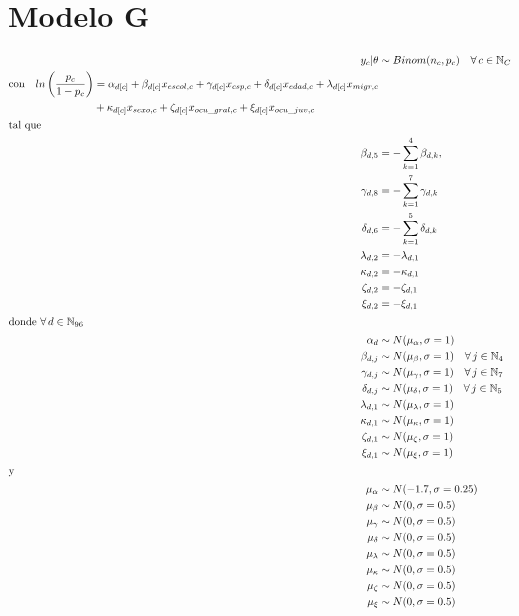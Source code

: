 \section*{Modelo G}

\begin{align}\label{eq:Modelo_Comp_G}
y_c|\theta & \sim Binom(n_c,p_c) \quad \forall \, c \in \mathbb{N}_C \nonumber \\
\begin{split}
\text{con} \quad ln\left(\dfrac{p_c}{1-p_c}\right) &= \alpha_{d[c]} + \beta_{d[c]} x_{escol,c} + \gamma_{d[c]} x_{csp,c} + \delta_{d[c]} x_{edad,c} + \lambda_{d[c]} x_{migr,c} \\
&+ \kappa_{d[c]} x_{sexo,c} + \zeta_{d[c]} x_{ocu\_gral,c} + \xi_{d[c]} x_{ocu\_juv,c} 
\end{split}\\
\intertext{tal que} 
\beta_{d,5} &= -\sum\limits_{k = 1}^{4} \beta_{d,k}, \nonumber \\
\gamma_{d,8} &= -\sum\limits_{k = 1}^{7} \gamma_{d,k} \nonumber \\
\delta_{d,6} &= -\sum\limits_{k = 1}^{5} \delta_{d,k} \nonumber \\
\lambda_{d,2} &= -\lambda_{d,1} \nonumber \\
\kappa_{d,2} &= -\kappa_{d,1} \nonumber \\
\zeta_{d,2} &= -\zeta_{d,1} \nonumber \\
\xi_{d,2} &= -\xi_{d,1} \nonumber \\
\intertext{donde $\forall \, d \in \mathbb{N}_{96}$}
\alpha_d &\sim N(\mu_{\alpha}, \sigma=1) \quad  \nonumber \\
\beta_{d,j} &\sim N(\mu_{\beta}, \sigma=1) \quad \forall \, j \in \mathbb{N}_{4} \nonumber \\
\gamma_{d,j} &\sim N(\mu_{\gamma}, \sigma=1) \quad \forall \, j \in \mathbb{N}_{7} \nonumber \\
\delta_{d,j} &\sim N(\mu_{\delta}, \sigma=1) \quad \forall \, j \in \mathbb{N}_{5}  \nonumber \\ 
\lambda_{d,1} &\sim N(\mu_{\lambda}, \sigma=1) \nonumber \\
\kappa_{d,1} &\sim N(\mu_{\kappa}, \sigma=1) \nonumber \\ 
\zeta_{d,1} &\sim N(\mu_{\zeta}, \sigma=1) \nonumber \\
\xi_{d,1} &\sim N(\mu_{\xi}, \sigma=1) \nonumber \\
\intertext{y}
\mu_{\alpha} &\sim N(-1.7,\sigma=0.25) \nonumber \\
\mu_{\beta} &\sim N(0,\sigma=0.5) \nonumber \\
\mu_{\gamma} &\sim N(0,\sigma=0.5) \nonumber \\
\mu_{\delta} &\sim N(0,\sigma=0.5) \nonumber \\
\mu_{\lambda} &\sim N(0,\sigma=0.5) \nonumber \\
\mu_{\kappa} &\sim N(0,\sigma=0.5) \nonumber \\
\mu_{\zeta} &\sim N(0,\sigma=0.5) \nonumber \\
\mu_{\xi} &\sim N(0,\sigma=0.5) \nonumber
\end{align}


